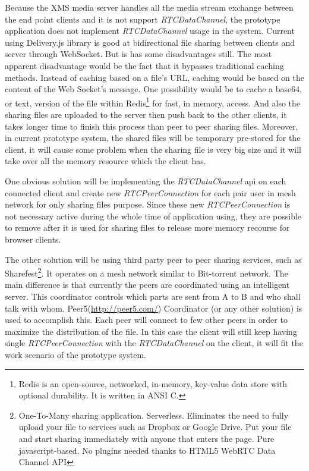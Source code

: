 \par Because the XMS media server handles all the media stream exchange between the end point clients and it is not support \textit{RTCDataChannel}, the prototype application does not implement \textit{RTCDataChannel} usage in the system. Current using Delivery.js library is good at bidirectional file sharing between clients and server through WebSocket. But is has some disadvantages still. The most apparent disadvantage would be the fact that it bypasses traditional caching methods. Instead of caching based on a file’s URL, caching would be based on the content of the Web Socket’s message. One possibility would be to cache a base64, or text, version of the file within Redis\footnote{Redis is an open-source, networked, in-memory, key-value data store with optional durability. It is written in ANSI C.\cite{wiki:redis}} for fast, in memory, access. And also the sharing files are uploaded to the server then push back to the other clients, it takes longer time to finish this process than peer to peer sharing files. Moreover, in current prototype system, the shared files will be temporary pre-stored for the client, it will cause some problem when the sharing file is very big size and it will take over all the memory resource which the client has.

\par One obvious solution will be implementing the \textit{RTCDataChannel} \gls{api} on each connected client and create new \textit{RTCPeerConnection} for each pair user in mesh network for only sharing files purpose. Since these new \textit{RTCPeerConnection}
is not necessary active during the whole time of application using, they are possible to remove after it is used for sharing files to release more memory recourse for browser clients.

\par The other solution will be using third party peer to peer sharing services, such as Sharefest\footnote{One-To-Many sharing application. Serverless. Eliminates the need to fully upload your file to services such as Dropbox or Google Drive. Put your file and start sharing immediately with anyone that enters the page. Pure javascript-based. No plugins needed thanks to HTML5 WebRTC Data Channel API}. It operates on a mesh network similar to Bit-torrent network. The main difference is that currently the peers are coordinated using an intelligent server. This coordinator controls which parts are sent from A to B and who shall talk with whom. Peer5(\url{http://peer5.com/}) Coordinator (or any other solution) is used to accomplish this. Each peer will connect to few other peers in order to maximize the distribution of the file.\cite{github:sharefest} In this case the client will still keep having single \textit{RTCPeerConnection} with the \textit{RTCDataChannel} on the client, it will fit the work scenario of the prototype system.

